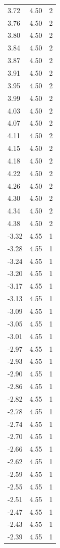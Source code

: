 \begin{longtable}{lrr}
  3.72 & 4.50 & 2 \\
  3.76 & 4.50 & 2 \\
  3.80 & 4.50 & 2 \\
  3.84 & 4.50 & 2 \\
  3.87 & 4.50 & 2 \\
  3.91 & 4.50 & 2 \\
  3.95 & 4.50 & 2 \\
  3.99 & 4.50 & 2 \\
  4.03 & 4.50 & 2 \\
  4.07 & 4.50 & 2 \\
  4.11 & 4.50 & 2 \\
  4.15 & 4.50 & 2 \\
  4.18 & 4.50 & 2 \\
  4.22 & 4.50 & 2 \\
  4.26 & 4.50 & 2 \\
  4.30 & 4.50 & 2 \\
  4.34 & 4.50 & 2 \\
  4.38 & 4.50 & 2 \\
  -3.32 & 4.55 & 1 \\
  -3.28 & 4.55 & 1 \\
  -3.24 & 4.55 & 1 \\
  -3.20 & 4.55 & 1 \\
  -3.17 & 4.55 & 1 \\
  -3.13 & 4.55 & 1 \\
  -3.09 & 4.55 & 1 \\
  -3.05 & 4.55 & 1 \\
  -3.01 & 4.55 & 1 \\
  -2.97 & 4.55 & 1 \\
  -2.93 & 4.55 & 1 \\
  -2.90 & 4.55 & 1 \\
  -2.86 & 4.55 & 1 \\
  -2.82 & 4.55 & 1 \\
  -2.78 & 4.55 & 1 \\
  -2.74 & 4.55 & 1 \\
  -2.70 & 4.55 & 1 \\
  -2.66 & 4.55 & 1 \\
  -2.62 & 4.55 & 1 \\
  -2.59 & 4.55 & 1 \\
  -2.55 & 4.55 & 1 \\
  -2.51 & 4.55 & 1 \\
  -2.47 & 4.55 & 1 \\
  -2.43 & 4.55 & 1 \\
  -2.39 & 4.55 & 1 \\

\end{longtable}
